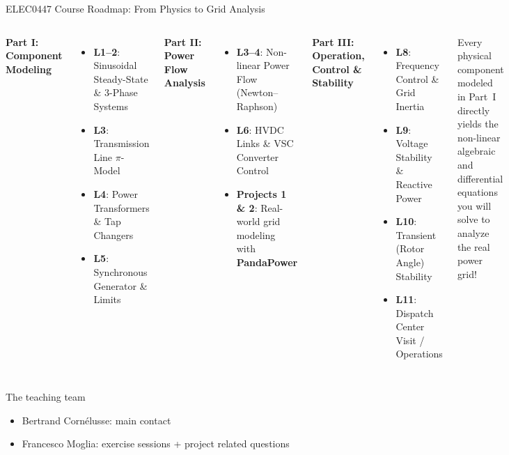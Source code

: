 \begin{frame}{ELEC0447 Course Roadmap: From Physics to Grid Analysis}
\begin{columns}
\textbf{Part I: Component Modeling}
\begin{itemize}\small
  \item \textbf{L1--2}: Sinusoidal Steady-State \& 3-Phase Systems
  \item \textbf{L3}: Transmission Line $\pi$-Model
  \item \textbf{L4}: Power Transformers \& Tap Changers
  \item \textbf{L5}: Synchronous Generator \& Limits
\end{itemize}
\medskip
\textbf{Part II: Power Flow Analysis}
\begin{itemize}\small
  \item \textbf{L3--4}: Non-linear Power Flow (Newton--Raphson)
  \item \textbf{L6}: HVDC Links \& VSC Converter Control
  \item \textbf{Projects 1 \& 2}: Real-world grid modeling with \textbf{PandaPower}
\end{itemize}

\textbf{Part III: Operation, Control \& Stability}
\begin{itemize}\small
  \item \textbf{L8}: Frequency Control \& Grid Inertia
  \item \textbf{L9}: Voltage Stability \& Reactive Power
  \item \textbf{L10}: Transient (Rotor Angle) Stability
  \item \textbf{L11}: Dispatch Center Visit / Operations
\end{itemize}
\medskip
\begin{tcolorbox}[colback=green!5!white,colframe=green!50!black,title=\small Unifying Goal of this Course]
\scriptsize
Every physical component modeled in Part~I directly yields the non-linear algebraic and differential equations you will solve to analyze the real power grid!
\end{tcolorbox}
\end{columns}
\end{frame}

\begin{frame}
{The teaching team}
\begin{itemize}
\item Bertrand Cornélusse: main contact
\item Francesco Moglia: exercise sessions + project related questions
\end{itemize}
\end{frame}

